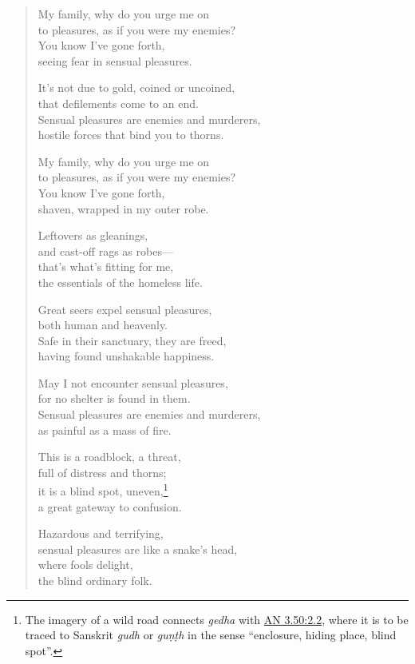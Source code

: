 \documentclass[12pt,openany]{book}%
\begin{document}
\begin{verse}
My family, why do you urge me on \\
to pleasures, as if you were my enemies? \\
You know I’ve gone forth, \\
seeing fear in sensual pleasures. 

It’s not due to gold, coined or uncoined, \\
that defilements come to an end. \\
Sensual pleasures are enemies and murderers, \\
hostile forces that bind you to thorns. 

My family, why do you urge me on \\
to pleasures, as if you were my enemies? \\
You know I’ve gone forth, \\
shaven, wrapped in my outer robe. 

Leftovers as gleanings, \\
and cast-off rags as robes—\\
that’s what’s fitting for me, \\
the essentials of the homeless life. 

Great seers expel sensual pleasures, \\
both human and heavenly. \\
Safe in their sanctuary, they are freed, \\
having found unshakable happiness. 

May I not encounter sensual pleasures, \\
for no shelter is found in them. \\
Sensual pleasures are enemies and murderers, \\
as painful as a mass of fire. 

This is a roadblock, a threat, \\
full of distress and thorns; \\
it is a blind spot, uneven,\footnote{The imagery of a wild road connects \textit{gedha} with \href{https://suttacentral.net/an3.50/en/sujato\#2.2}{AN 3.50:2.2}, where it is to be traced to Sanskrit \textit{gudh} or \textit{\textsanskrit{guṇṭh}} in the sense “enclosure, hiding place, blind spot”. } \\
a great gateway to confusion. 

Hazardous and terrifying, \\
sensual pleasures are like a snake’s head, \\
where fools delight, \\
the blind ordinary folk. 


\end{verse}
\end{document}
